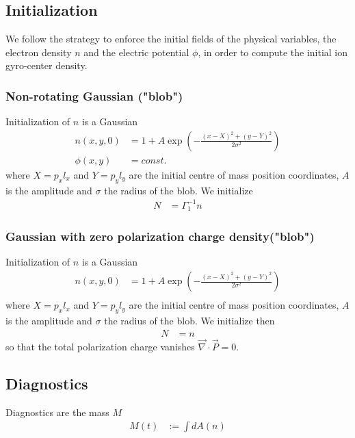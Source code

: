 \subsection{Initialization}
We follow the strategy to enforce the initial fields of the physical variables, 
the electron density \(n\) and the electric potential \(\phi\), in order to 
compute the initial ion gyro-center density.
\subsubsection{Non-rotating Gaussian ("blob")}
Initialization of $n$ is a Gaussian 
\begin{align}
    n(x,y,0) &= 1 + A\exp\left( -\frac{(x-X)^2 + (y-Y)^2}{2\sigma^2}\right) \\
    \phi(x,y)&=const.
\end{align}
where $X = p_x l_x$ and $Y=p_yl_y$ are the initial centre of mass position 
coordinates, $A$ is the amplitude and $\sigma$ the
radius of the blob.
We initialize 
\begin{align}
    N &= \Gamma_1^{-1} n 
\end{align}
\subsubsection{Gaussian with zero polarization charge density("blob")}
Initialization of $n$ is a Gaussian 
\begin{align}
    n(x,y,0) &= 1 + A\exp\left( -\frac{(x-X)^2 + (y-Y)^2}{2\sigma^2}\right) \\
\end{align}
where $X = p_x l_x$ and $Y=p_yl_y$ are the initial centre of mass position 
coordinates, $A$ is the amplitude and $\sigma$ the radius of the blob. We 
initialize then
\begin{align}
    N &= n 
\end{align}
so that the total polarization charge vanishes  \(\vec{\nabla}\cdot \vec{P}=0\).
\subsection{Diagnostics}
Diagnostics are the mass \(M\)
\begin{align}
    M(t) &:= \int dA (n)  \\
\end{align}
